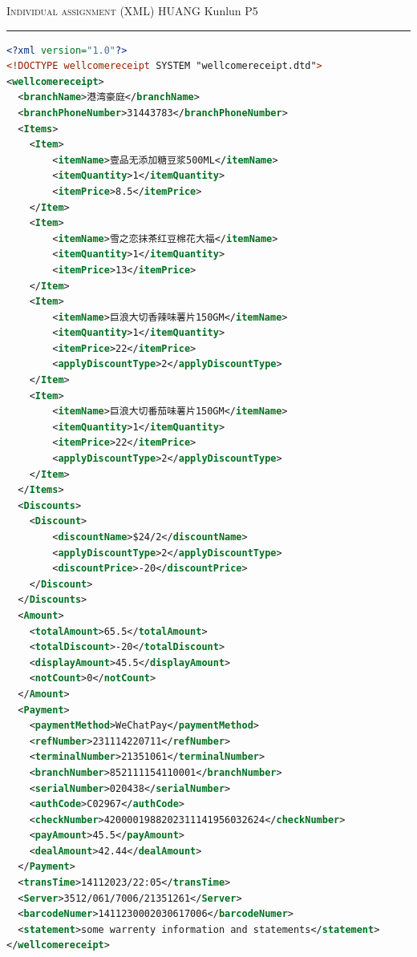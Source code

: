 \documentclass[12pt]{amsart}
\begin{document}
\newpage
{} \hfill {\scshape \large Individual assignment (XML)} \hfill HUANG Kunlun \hfill {\scshape P5}
 
\smallskip

\hrule

\bigskip


\begin{lstlisting}[caption={XML file 2},label={lst:xmlfile2},
    language=XML,breaklines=true]
<?xml version="1.0"?>
<!DOCTYPE wellcomereceipt SYSTEM "wellcomereceipt.dtd">
<wellcomereceipt>
  <branchName>港湾豪庭</branchName>
  <branchPhoneNumber>31443783</branchPhoneNumber>
  <Items>
    <Item>
        <itemName>壹品无添加糖豆浆500ML</itemName>
        <itemQuantity>1</itemQuantity>
        <itemPrice>8.5</itemPrice>
    </Item>
    <Item>
        <itemName>雪之恋抹茶红豆棉花大福</itemName>
        <itemQuantity>1</itemQuantity>
        <itemPrice>13</itemPrice>
    </Item>
    <Item>
        <itemName>巨浪大切香辣味薯片150GM</itemName>
        <itemQuantity>1</itemQuantity>
        <itemPrice>22</itemPrice>
        <applyDiscountType>2</applyDiscountType>
    </Item>
    <Item>
        <itemName>巨浪大切番茄味薯片150GM</itemName>
        <itemQuantity>1</itemQuantity>
        <itemPrice>22</itemPrice>
        <applyDiscountType>2</applyDiscountType>
    </Item>
  </Items>
  <Discounts>
    <Discount>
        <discountName>$24/2</discountName>
        <applyDiscountType>2</applyDiscountType>
        <discountPrice>-20</discountPrice>
    </Discount>
  </Discounts>
  <Amount>
    <totalAmount>65.5</totalAmount>
    <totalDiscount>-20</totalDiscount>
    <displayAmount>45.5</displayAmount>
    <notCount>0</notCount>
  </Amount>
  <Payment>
    <paymentMethod>WeChatPay</paymentMethod>
    <refNumber>231114220711</refNumber>
    <terminalNumber>21351061</terminalNumber>
    <branchNumber>852111154110001</branchNumber>
    <serialNumber>020438</serialNumber>
    <authCode>C02967</authCode>
    <checkNumber>4200001988202311141956032624</checkNumber>
    <payAmount>45.5</payAmount>
    <dealAmount>42.44</dealAmount>
  </Payment>
  <transTime>14112023/22:05</transTime>
  <Server>3512/061/7006/21351261</Server>
  <barcodeNumer>1411230002030617006</barcodeNumer>
  <statement>some warrenty information and statements</statement>
</wellcomereceipt> 

\end{lstlisting}

\newpage
\end{document}

